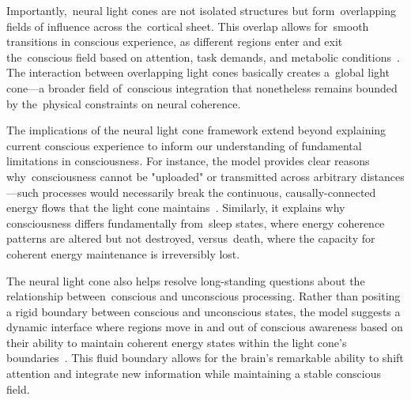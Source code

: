 Importantly,~neural light cones are not isolated structures but form~overlapping fields of influence across the~cortical sheet. This overlap allows for~smooth transitions in conscious experience, as different regions enter and exit the~conscious field based on attention, task demands, and metabolic conditions~\cite{kelso2012}. The interaction between overlapping light cones basically creates a~global light cone—a broader field of~conscious integration that nonetheless remains bounded by the~physical constraints on neural coherence.

The implications of the neural light cone framework extend beyond explaining current conscious experience to inform our understanding of fundamental limitations in consciousness. For instance, the model provides clear reasons why~consciousness cannot be "uploaded" or transmitted across arbitrary distances—such processes would necessarily break the continuous, causally-connected energy flows that the light cone maintains~\cite{landauer1996}. Similarly, it explains why consciousness differs fundamentally from~sleep states, where energy coherence patterns are altered but not destroyed, versus~death, where the capacity for coherent energy maintenance is irreversibly lost.

The neural light cone also helps resolve long-standing questions about the relationship between~conscious and unconscious processing. Rather than positing a rigid boundary between conscious and unconscious states, the model suggests a dynamic interface where regions move in and out of conscious awareness based on their ability to maintain coherent energy states within the light cone's boundaries~\cite{dehaene2011}. This fluid boundary allows for the brain's remarkable ability to shift attention and integrate new information while maintaining a stable conscious field.

